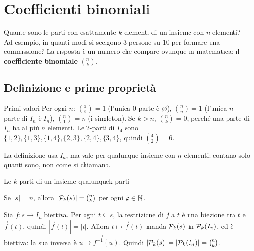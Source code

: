 \chapter{Coefficienti binomiali}\label{cap:binomiali}

Quante sono le parti con esattamente $k$ elementi di un insieme con $n$ elementi? Ad esempio, in quanti modi si scelgono
$3$ persone su $10$ per formare una commissione? La risposta è un numero che compare ovunque in matematica: il
\textbf{coefficiente binomiale} $\binom{n}{k}$.

\section{Definizione e prime proprietà}\label{sec:def-binomiali}


\begin{esempio}{Primi valori}
    Per ogni $n$: $\binom{n}{0} = 1$ (l'unica $0$-parte è $\varnothing$), $\binom{n}{n} = 1$ (l'unica $n$-parte di $I_n$ è $I_n$), $\binom{n}{1} = n$
    (i singleton). Se $k > n$, $\binom{n}{k} = 0$, perché una parte di $I_n$ ha al più $n$ elementi. Le $2$-parti di $I_4$ sono
    $\{1, 2\}, \{1, 3\}, \{1, 4\}, \{2, 3\}, \{2, 4\}, \{3, 4\}$, quindi $\binom{4}{2} = 6$.
\end{esempio}

La definizione usa $I_n$, ma vale per qualunque insieme con $n$ elementi: contano solo quanti sono, non come si chiamano.

\begin{concetto}
\begin{Proposizione}{Le $k$-parti di un insieme qualunque}{k-parti}
    \begin{prerequisiti}
    \end{prerequisiti}
    Se $|s| = n$, allora $|\mathcal{P}_k(s)| = \binom{n}{k}$ per ogni $k \in \mathbb{N}$.
\end{Proposizione}
\begin{dimostrazione}
    Sia $f \colon s \to I_n$ biettiva. Per ogni $t \subseteq s$, la restrizione di $f$ a $t$ è una biezione tra $t$ e $\overrightarrow{f}(t)$, quindi
    $|\overrightarrow{f}(t)| = |t|$. Allora $t \mapsto \overrightarrow{f}(t)$ manda $\mathcal{P}_k(s)$ in $\mathcal{P}_k(I_n)$, ed è biettiva: la sua inversa è
    $u \mapsto \overrightarrow{f^{-1}}(u)$. Quindi $|\mathcal{P}_k(s)| = |\mathcal{P}_k(I_n)| = \binom{n}{k}$.
\end{dimostrazione}
\end{concetto}

